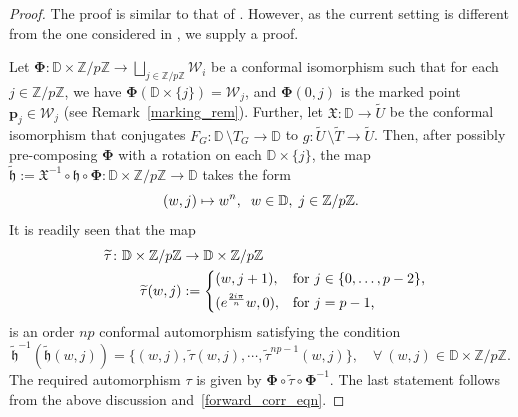 \documentclass[11pt,a4paper, oneside]{amsart}
\theoremstyle{definition}
\theoremstyle{remark}
\numberwithin{equation}{section}
\def\D{{\mathbb{D}}}
\def\Z{{\mathbb{Z}}}
\def\cW{\mathcal {W}}
\newcommand{\sm}{\setminus}
\renewcommand{\tilde}{\widetilde}
\begin{document}
\begin{proof}
    The proof is similar to that of \cite[Proposition~5.4]{MM}. However, as the current setting is different from the one considered in \cite{MM}, we supply a proof. 
    
    Let $\displaystyle\pmb{\Phi}: \mathbb{D}\times\Z/p\Z\rightarrow \bigsqcup_{j\in\Z/p\Z}\pmb{\cW}_i$ be a conformal isomorphism such that for each $j\in \Z/p\Z$, we have $\pmb{\Phi}(\D\times\{j\})=\pmb{\cW}_j$, and $\pmb{\Phi}(0, j)$ is the marked point $\pmb{p}_j\in\pmb{\cW}_j$ (see Remark~\ref{marking_rem}). Further, let $\mathfrak{X}:\D\to\tilde U$ be the conformal isomorphism that conjugates $F_G\colon\D\,\sm T_G\to \D$ to $g\colon\tilde U\,\sm\tilde T\to\tilde U$.
     Then, after possibly pre-composing $\pmb{\Phi}$ with a rotation on each $\mathbb{D}\times\{j\}$, the map $\widetilde{\mathfrak{h}}:= \mathfrak{X}^{-1}\circ \mathfrak{h}\circ \pmb{\Phi}:\mathbb{D}\times\Z/p\Z\rightarrow \D$ takes the form
\begin{equation*}
    (w, j) \mapsto w^{n}, \hspace{2mm}w\in \mathbb{D}, \hspace{1mm}j\in \Z/p\Z.
\end{equation*}
It is readily seen that the map 
\begin{equation*}
\begin{split}
\quad \tilde \tau \colon \mathbb{D} \times \Z/p\Z &\rightarrow \mathbb{D} \times \Z/p\Z \\
\tilde \tau(w, j) &:= 
\begin{cases*}
    (w, j+1), & for $j \in \{0, \dots, p-2\}$, \\
    (e^{\frac{2i\pi}{n}}w, 0), & for $j = p-1$,
\end{cases*}
\end{split}
\end{equation*}
is an order $np$ conformal automorphism satisfying the condition
 $$
\widetilde{\mathfrak{h}}^{-1}(\widetilde{\mathfrak{h}}(w, j)) = \{(w, j), \widetilde{\tau}(w, j), \cdots, \widetilde{\tau}^{np-1}(w, j)\},\quad \forall\ (w, j) \in \mathbb{D}\times\Z/p\Z.
$$
The required automorphism $\tau$ is given by $\pmb{\Phi}\circ\tilde \tau\circ\pmb{\Phi}^{-1}$. The last statement follows from the above discussion and~\eqref{forward_corr_eqn}.
\end{proof}
\end{document}
